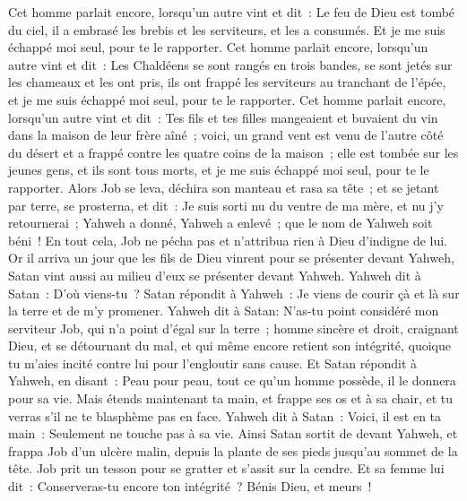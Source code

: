 \begin{multicols}{2}
Cet homme parlait encore, lorsqu'un autre vint et dit~: Le feu de Dieu est tombé du ciel, il a embrasé les brebis et les serviteurs, et les a consumés. Et je me suis échappé moi seul, pour te le rapporter.
Cet homme parlait encore, lorsqu'un autre vint et dit~: Les Chaldéens se sont rangés en trois bandes, se sont jetés sur les chameaux et les ont pris, ils ont frappé les serviteurs au tranchant de l'épée, et je me suis échappé moi seul, pour te le rapporter.
Cet homme parlait encore, lorsqu'un autre vint et dit~: Tes fils et tes filles mangeaient et buvaient du vin dans la maison de leur frère aîné~;
voici, un grand vent est venu de l'autre côté du désert et a frappé contre les quatre coins de la maison~; elle est tombée sur les jeunes gens, et ils sont tous morts, et je me suis échappé moi seul, pour te le rapporter.
Alors Job se leva, déchira son manteau et rasa sa tête~; et se jetant par terre, se prosterna,
et dit~: Je suis sorti nu du ventre de ma mère, et nu j'y retournerai~; Yahweh a donné, Yahweh a enlevé~; que le nom de Yahweh soit béni~!
En tout cela, Job ne pécha pas et n'attribua rien à Dieu d'indigne de lui.
\VerseOne{}Or il arriva un jour que les fils de Dieu vinrent pour se présenter devant Yahweh, Satan vint aussi au milieu d'eux se présenter devant Yahweh.
Yahweh dit à Satan~: D'où viens-tu~? Satan répondit à Yahweh~: Je viens de courir çà et là sur la terre et de m'y promener.
Yahweh dit à Satan: N'as-tu point considéré mon serviteur Job, qui n'a point d'égal sur la terre~; homme sincère et droit, craignant Dieu, et se détournant du mal, et qui même encore retient son intégrité, quoique tu m'aies incité contre lui pour l'engloutir sans cause.
Et Satan répondit à Yahweh, en disant~: Peau pour peau, tout ce qu'un homme possède, il le donnera pour sa vie.
Mais étends maintenant ta main, et frappe ses os et à sa chair, et tu verras s'il ne te blasphème pas en face. 
Yahweh dit à Satan~: Voici, il est en ta main~: Seulement ne touche pas à sa vie.
Ainsi Satan sortit de devant Yahweh, et frappa Job d'un ulcère malin, depuis la plante de ses pieds jusqu'au sommet de la tête.
Job prit un tesson pour se gratter et s'assit sur la cendre.
Et sa femme lui dit~: Conserveras-tu encore ton intégrité~? Bénis Dieu, et meurs~!

\end{multicols}
